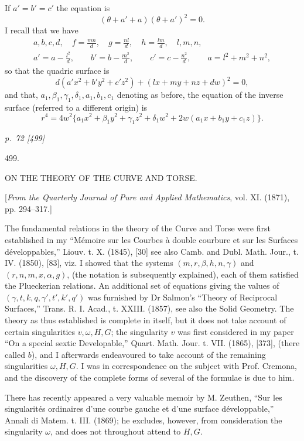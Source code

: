 \documentclass[11pt,a4paper]{article}
\newcommand{\pagemarker}[2]{\clearpage\noindent\textit{p.~#1 [#2]}\par\medskip}
\begin{document}
If \(a'=b'=c'\) the equation is
\[
  (\theta+a'+a)(\theta+a')^2=0.
\]
I recall that we have
\[
\begin{gathered}
a,b,c,d,\quad f=\frac{mn}{d},\quad g=\frac{nl}{d},\quad h=\frac{lm}{d},\quad l,m,n,\\
a'=a-\frac{l^2}{d},\qquad b'=b-\frac{m^2}{d},\qquad c'=c-\frac{n^2}{d},\qquad
a=l^2+m^2+n^2,
\end{gathered}
\]
so that the quadric surface is
\[
  d(a'x^2+b'y^2+c'z^2)+(lx+my+nz+dw)^2=0,
\]
and that, \(a_1,\beta_1,\gamma_1,\delta_1,a_1,b_1,c_1\) denoting as before, the
equation of the inverse surface (referred to a different origin) is
\[
  r^4=4w^2\{a_1x^2+\beta_1y^2+\gamma_1z^2+\delta_1w^2
  +2w(a_1x+b_1y+c_1z)\}.
\]

\pagemarker{72}{499}
\begin{center}
{\Large 499.}

\vspace{1em}
{\large ON THE THEORY OF THE CURVE AND TORSE.}

\vspace{1em}
[\textit{From the Quarterly Journal of Pure and Applied Mathematics}, vol. XI. (1871),\\
pp. 294--317.]
\end{center}

The fundamental relations in the theory of the Curve and Torse were first established
in my ``M\'emoire sur les Courbes \`a double courbure et sur les Surfaces
d\'eveloppables,'' Liouv. t. X. (1845), [30] see also Camb. and Dubl. Math. Jour.,
t. IV. (1850), [83], viz. I showed that the systems
\((m,r,\beta,h,n,\gamma)\) and \((r,n,m,x,\alpha,g)\), (the notation is subsequently
explained), each of them satisfied the Plueckerian relations. An additional set of
equations giving the values of
\((\gamma,t,k,q,\gamma',t',k',q')\) was furnished by Dr Salmon's ``Theory of Reciprocal
Surfaces,'' Trans. R. I. Acad., t. XXIII. (1857), see also the Solid Geometry. The
theory as thus established is complete in itself, but it does not take account of
certain singularities \(v,\omega,H,G\); the singularity \(v\) was first considered in my
paper ``On a special sextic Developable,'' Quart. Math. Jour. t. VII. (1865), [373],
(there called \(b\)), and I afterwards endeavoured to take account of the remaining
singularities \(\omega,H,G\). I was in correspondence on the subject with Prof. Cremona,
and the discovery of the complete forms of several of the formulae is due to him.

There has recently appeared a very valuable memoir by M. Zeuthen, ``Sur les
singularit\'es ordinaires d'une courbe gauche et d'une surface d\'eveloppable,'' Annali
di Matem. t. III. (1869); he excludes, however, from consideration the singularity
\(\omega\), and does not throughout attend to \(H,G\).
\end{document}

